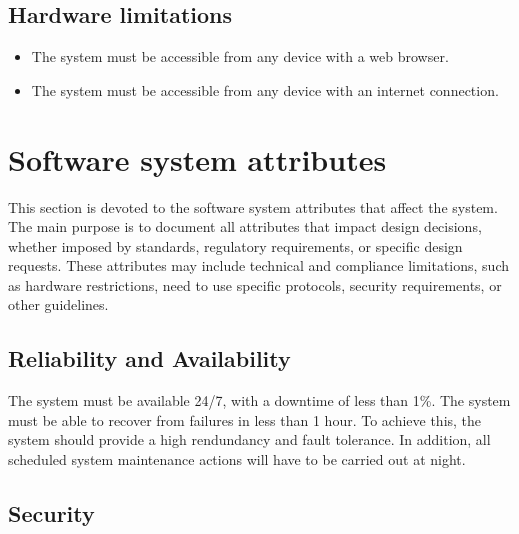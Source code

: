 \subsection{Hardware limitations}
    \begin{itemize}
        \item The system must be accessible from any device with a web browser.
        \item The system must be accessible from any device with an internet connection.
    \end{itemize}

\section{Software system attributes}
This section is devoted to the software system attributes that affect the system. 
    The main purpose is to document all attributes that impact design decisions, whether imposed by standards, 
    regulatory requirements, or specific design requests. 
    These attributes may include technical and compliance limitations, such as hardware restrictions, 
    need to use specific protocols, security requirements, or other guidelines.
\subsection{Reliability and Availability}
The system must be available 24/7, with a downtime of less than 1\%. The system must be able to recover from failures in less than 1 hour. 
To achieve this, the system should provide a high rendundancy and fault tolerance. In addition, all scheduled system maintenance actions will have to be carried out at night.

\subsection{Security}


